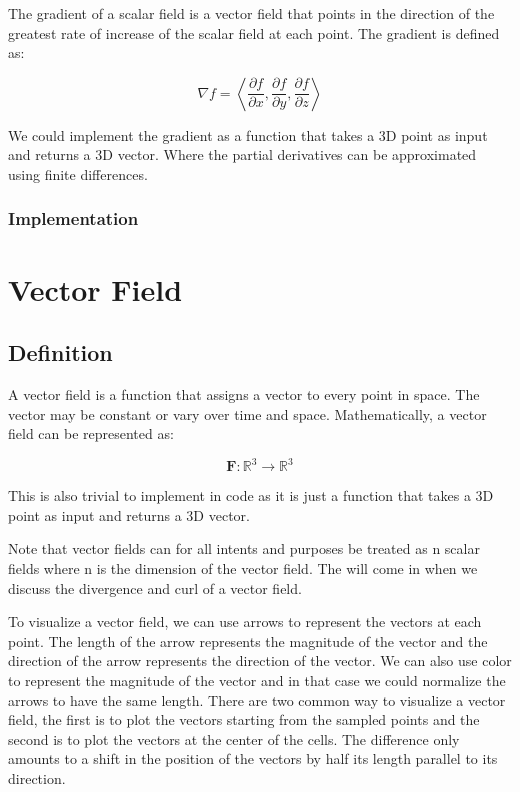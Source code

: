 \documentclass[12pt]{article}
\begin{document}
The gradient of a scalar field is a vector field that points in the direction of the greatest rate of increase of the scalar field at each point. The gradient is defined as:

\[
    \nabla f = \left\langle \frac{\partial f}{\partial x}, \frac{\partial f}{\partial y}, \frac{\partial f}{\partial z}\right\rangle
\]

We could implement the gradient as a function that takes a 3D point as input and returns a 3D vector.
Where the partial derivatives can be approximated using finite differences.

\subsubsection{Implementation}

\newpage
\section{Vector Field}
\subsection{Definition}

A vector field is a function that assigns a vector to every point in space. The vector may be constant or vary over time and space. Mathematically, a vector field can be represented as:

\[
    \mathbf{F}: \mathbb{R}^3 \rightarrow \mathbb{R}^3
\]

This is also trivial to implement in code as it is just a function that takes a 3D point as input and returns a 3D vector.

Note that vector fields can for all intents and purposes be treated as n scalar fields where n is the dimension of the vector field. The will come in when we discuss the divergence and curl of a vector field.

To visualize a vector field, we can use arrows to represent the vectors at each point. The length of the arrow represents the magnitude of the vector and the direction of the arrow represents the direction of the vector. We can also use color to represent the magnitude of the vector and in that case we could normalize the arrows to have the same length.
There are two common way to visualize a vector field, the first is to plot the vectors starting from the sampled points and the second is to plot the vectors at the center of the cells.
The difference only amounts to a shift in the position of the vectors by half its length parallel to its direction.
\end{document}
